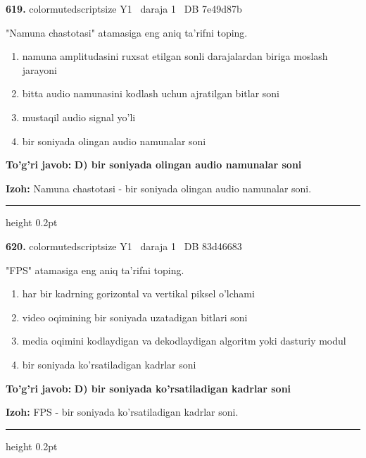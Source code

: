 \documentclass[10pt,a4paper,oneside]{article}
\begin{document}
\noindent\textbf{\color{ink}619.}  {color{muted}scriptsize Y1 \textbullet\ daraja 1 \textbullet\ DB 7e49d87b}
\par
"Namuna chastotasi" atamasiga eng aniq ta'rifni toping.
\begin{enumerate}[label=\Alph*),leftmargin=9mm]
\item namuna amplitudasini ruxsat etilgan sonli darajalardan biriga moslash jarayoni
\item bitta audio namunasini kodlash uchun ajratilgan bitlar soni
\item mustaqil audio signal yo'li
\item bir soniyada olingan audio namunalar soni
\end{enumerate}
\begin{tcolorbox}[enhanced,breakable,colback=teal!4,colframe=teal!50!black,boxrule=0.5pt,arc=1.1mm,left=3mm,right=3mm,top=1.7mm,bottom=1.7mm,before skip=2mm,after skip=2mm]
\textbf{\color{teal}To'g'ri javob:} \textbf{D) bir soniyada olingan audio namunalar soni}
\par\smallskip
\textbf{Izoh:} Namuna chastotasi - bir soniyada olingan audio namunalar soni.
\end{tcolorbox}
\vspace{2mm}\hrule height 0.2pt \vspace{3mm}

\noindent\textbf{\color{ink}620.}  {color{muted}scriptsize Y1 \textbullet\ daraja 1 \textbullet\ DB 83d46683}
\par
"FPS" atamasiga eng aniq ta'rifni toping.
\begin{enumerate}[label=\Alph*),leftmargin=9mm]
\item har bir kadrning gorizontal va vertikal piksel o'lchami
\item video oqimining bir soniyada uzatadigan bitlari soni
\item media oqimini kodlaydigan va dekodlaydigan algoritm yoki dasturiy modul
\item bir soniyada ko'rsatiladigan kadrlar soni
\end{enumerate}
\begin{tcolorbox}[enhanced,breakable,colback=teal!4,colframe=teal!50!black,boxrule=0.5pt,arc=1.1mm,left=3mm,right=3mm,top=1.7mm,bottom=1.7mm,before skip=2mm,after skip=2mm]
\textbf{\color{teal}To'g'ri javob:} \textbf{D) bir soniyada ko'rsatiladigan kadrlar soni}
\par\smallskip
\textbf{Izoh:} FPS - bir soniyada ko'rsatiladigan kadrlar soni.
\end{tcolorbox}
\vspace{2mm}\hrule height 0.2pt \vspace{3mm}
\end{document}
